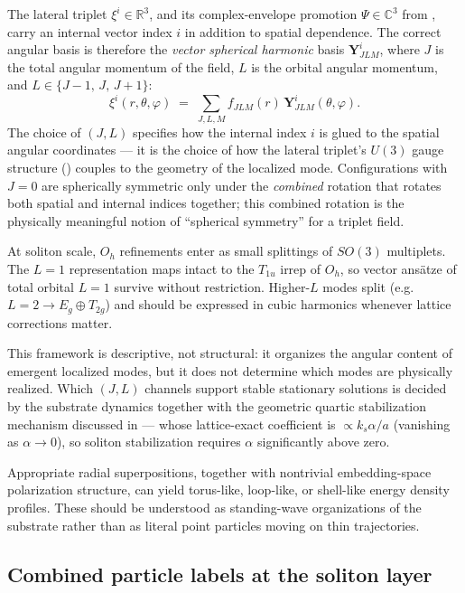 The lateral triplet $\xi^i \in \mathbb{R}^3$, and its complex-envelope promotion $\Psi \in \mathbb{C}^3$ from
, carry an internal vector index $i$ in addition to spatial dependence. The correct angular
basis is therefore the \emph{vector spherical harmonic} basis $\mathbf{Y}^{i}_{JLM}$, where $J$ is the total
angular momentum of the field, $L$ is the orbital angular momentum, and $L \in \{J-1,\, J,\, J+1\}$:
\begin{equation}
  \xi^{i}(r,\theta,\varphi) \;=\; \sum_{J,L,M} f_{JLM}(r)\, \mathbf{Y}^{i}_{JLM}(\theta,\varphi).
  \label{eq:vsh-decomposition}
\end{equation}
The choice of $(J,L)$ specifies how the internal index $i$ is glued to the spatial angular coordinates --- it is
the choice of how the lateral triplet's $U(3)$ gauge structure () couples to the geometry of
the localized mode. Configurations with $J = 0$ are spherically symmetric only under the \emph{combined} rotation
that rotates both spatial and internal indices together; this combined rotation is the physically meaningful
notion of ``spherical symmetry'' for a triplet field.

At soliton scale, $O_h$ refinements enter as small splittings of $SO(3)$ multiplets.
The $L = 1$ representation maps intact to the $T_{1u}$ irrep of $O_h$, so vector ansätze of total orbital
$L = 1$ survive without restriction.
Higher-$L$ modes split (e.g.\ $L = 2 \to E_g \oplus T_{2g}$) and should be expressed in cubic harmonics whenever
lattice corrections matter.

This framework is descriptive, not structural: it organizes the angular content of emergent localized modes, but
it does not determine which modes are physically realized. Which $(J,L)$ channels support stable stationary
solutions is decided by the substrate dynamics together with the geometric quartic stabilization mechanism
discussed in  --- whose lattice-exact coefficient is $\propto k_s\alpha/a$
(vanishing as $\alpha\to 0$), so soliton stabilization requires $\alpha$ significantly above zero.

Appropriate radial superpositions, together with nontrivial embedding-space polarization structure, can yield
torus-like, loop-like, or shell-like energy density profiles.
These should be understood as standing-wave organizations of the substrate rather than as literal point particles
moving on thin trajectories.

\subsection{Combined particle labels at the soliton layer}
\label{sec:soliton-labels}

